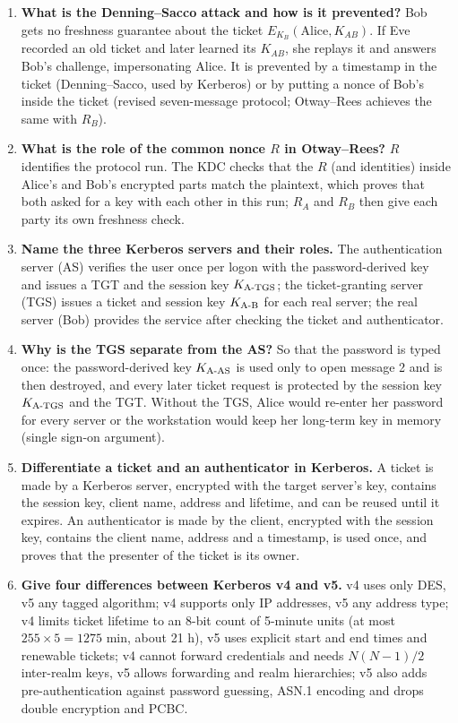\begin{enumerate}[leftmargin=1.6em,itemsep=3pt]
  \item \textbf{What is the Denning--Sacco attack and how is it prevented?} Bob gets no freshness guarantee about the ticket $E_{K_B}(\text{Alice}, K_{AB})$. If Eve recorded an old ticket and later learned its $K_{AB}$, she replays it and answers Bob's challenge, impersonating Alice. It is prevented by a timestamp in the ticket (Denning--Sacco, used by Kerberos) or by putting a nonce of Bob's inside the ticket (revised seven-message protocol; Otway--Rees achieves the same with $R_B$).
  \item \textbf{What is the role of the common nonce $R$ in Otway--Rees?} $R$ identifies the protocol run. The KDC checks that the $R$ (and identities) inside Alice's and Bob's encrypted parts match the plaintext, which proves that both asked for a key with each other in this run; $R_A$ and $R_B$ then give each party its own freshness check.
  \item \textbf{Name the three Kerberos servers and their roles.} The authentication server (AS) verifies the user once per logon with the password-derived key and issues a TGT and the session key $K_{\text{A-TGS}}$; the ticket-granting server (TGS) issues a ticket and session key $K_{\text{A-B}}$ for each real server; the real server (Bob) provides the service after checking the ticket and authenticator.
  \item \textbf{Why is the TGS separate from the AS?} So that the password is typed once: the password-derived key $K_{\text{A-AS}}$ is used only to open message 2 and is then destroyed, and every later ticket request is protected by the session key $K_{\text{A-TGS}}$ and the TGT. Without the TGS, Alice would re-enter her password for every server or the workstation would keep her long-term key in memory (single sign-on argument).
  \item \textbf{Differentiate a ticket and an authenticator in Kerberos.} A ticket is made by a Kerberos server, encrypted with the target server's key, contains the session key, client name, address and lifetime, and can be reused until it expires. An authenticator is made by the client, encrypted with the session key, contains the client name, address and a timestamp, is used once, and proves that the presenter of the ticket is its owner.
  \item \textbf{Give four differences between Kerberos v4 and v5.} v4 uses only DES, v5 any tagged algorithm; v4 supports only IP addresses, v5 any address type; v4 limits ticket lifetime to an 8-bit count of 5-minute units (at most $255 \times 5 = 1275$ min, about 21 h), v5 uses explicit start and end times and renewable tickets; v4 cannot forward credentials and needs $N(N-1)/2$ inter-realm keys, v5 allows forwarding and realm hierarchies; v5 also adds pre-authentication against password guessing, ASN.1 encoding and drops double encryption and PCBC.

\end{enumerate}
